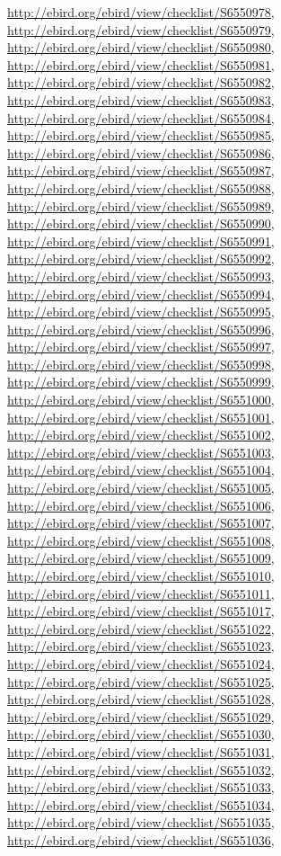 \documentclass[9pt, article]{memoir}
\begin{document}
\begin{multicols}{2}
\url{http://ebird.org/ebird/view/checklist/S6550978}, 
\url{http://ebird.org/ebird/view/checklist/S6550979}, 
\url{http://ebird.org/ebird/view/checklist/S6550980}, 
\url{http://ebird.org/ebird/view/checklist/S6550981}, 
\url{http://ebird.org/ebird/view/checklist/S6550982}, 
\url{http://ebird.org/ebird/view/checklist/S6550983}, 
\url{http://ebird.org/ebird/view/checklist/S6550984}, 
\url{http://ebird.org/ebird/view/checklist/S6550985}, 
\url{http://ebird.org/ebird/view/checklist/S6550986}, 
\url{http://ebird.org/ebird/view/checklist/S6550987}, 
\url{http://ebird.org/ebird/view/checklist/S6550988}, 
\url{http://ebird.org/ebird/view/checklist/S6550989}, 
\url{http://ebird.org/ebird/view/checklist/S6550990}, 
\url{http://ebird.org/ebird/view/checklist/S6550991}, 
\url{http://ebird.org/ebird/view/checklist/S6550992}, 
\url{http://ebird.org/ebird/view/checklist/S6550993}, 
\url{http://ebird.org/ebird/view/checklist/S6550994}, 
\url{http://ebird.org/ebird/view/checklist/S6550995}, 
\url{http://ebird.org/ebird/view/checklist/S6550996}, 
\url{http://ebird.org/ebird/view/checklist/S6550997}, 
\url{http://ebird.org/ebird/view/checklist/S6550998}, 
\url{http://ebird.org/ebird/view/checklist/S6550999}, 
\url{http://ebird.org/ebird/view/checklist/S6551000}, 
\url{http://ebird.org/ebird/view/checklist/S6551001}, 
\url{http://ebird.org/ebird/view/checklist/S6551002}, 
\url{http://ebird.org/ebird/view/checklist/S6551003}, 
\url{http://ebird.org/ebird/view/checklist/S6551004}, 
\url{http://ebird.org/ebird/view/checklist/S6551005}, 
\url{http://ebird.org/ebird/view/checklist/S6551006}, 
\url{http://ebird.org/ebird/view/checklist/S6551007}, 
\url{http://ebird.org/ebird/view/checklist/S6551008}, 
\url{http://ebird.org/ebird/view/checklist/S6551009}, 
\url{http://ebird.org/ebird/view/checklist/S6551010}, 
\url{http://ebird.org/ebird/view/checklist/S6551011}, 
\url{http://ebird.org/ebird/view/checklist/S6551017}, 
\url{http://ebird.org/ebird/view/checklist/S6551022}, 
\url{http://ebird.org/ebird/view/checklist/S6551023}, 
\url{http://ebird.org/ebird/view/checklist/S6551024}, 
\url{http://ebird.org/ebird/view/checklist/S6551025}, 
\url{http://ebird.org/ebird/view/checklist/S6551028}, 
\url{http://ebird.org/ebird/view/checklist/S6551029}, 
\url{http://ebird.org/ebird/view/checklist/S6551030}, 
\url{http://ebird.org/ebird/view/checklist/S6551031}, 
\url{http://ebird.org/ebird/view/checklist/S6551032}, 
\url{http://ebird.org/ebird/view/checklist/S6551033}, 
\url{http://ebird.org/ebird/view/checklist/S6551034}, 
\url{http://ebird.org/ebird/view/checklist/S6551035}, 
\url{http://ebird.org/ebird/view/checklist/S6551036}, 

\end{multicols}
\end{document}
